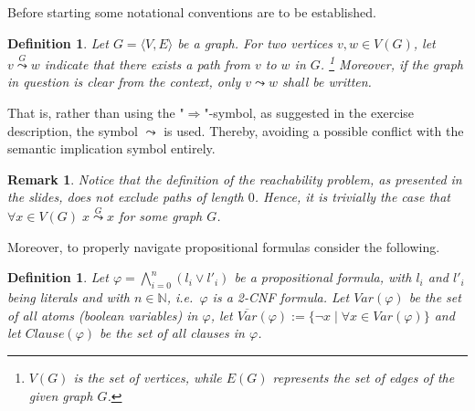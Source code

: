 \documentclass [11pt]{article}
\newcommand{\sto}{\Rightarrow}
\newcommand{\clau}{\mathit{Clause}}
\newcommand{\var}{\mathit{Var}}
\newtheorem{definition}[theorem]{Definition}
\newtheorem{remark}[theorem]{Remark}
\newcommand{\reach}{\leadsto}
\newcommand{\sreach}[1]{\stackrel{#1}{\leadsto}}
\begin{document}
Before starting some notational conventions are to be established.

\begin{definition}
Let $G=\langle V,E \rangle$ be a graph. For two vertices $v,w \in V(G)$, let $v \sreach{G} w$ indicate that there exists a path from $v$ to $w$ in $G$. \footnote{$V(G)$ is the set of vertices, while $E(G)$ represents the set of edges of the given graph $G$.}
Moreover, if the graph in question is clear from the context, only $v \reach w$ shall be written.
\end{definition}



That is, rather than using the "$\sto$"-symbol, as suggested in the exercise description, the symbol  $ \leadsto $ is used. Thereby, avoiding a possible conflict with the semantic implication symbol entirely. 

\begin{remark}
Notice that the definition of the reachability problem, as presented in the slides, does not exclude paths of length $0$. Hence, it is trivially the case that $\forall x \in V(G) \; x \sreach{G} x$ for some graph $G$. 
\end{remark}

Moreover, to properly navigate propositional formulas consider the following.

\begin{definition}
\label{def:2cnf}
Let $\varphi=\bigwedge_{i=0}^n (l_{i} \lor l'_{i})$ be a propositional formula, with $l_i$ and $l'_i$ being literals and with $n\in \mathbb{N}$, i.e.\ $\varphi$ is a 2-CNF formula. Let $\var(\varphi)$ be the set of all atoms (boolean variables) in $\varphi$, let $\overline{\var}(\varphi):=\{\neg x \mid \forall x \in \var(\varphi)\}$ and let $\clau(\varphi)$ be the set of all clauses in $\varphi$.
\end{definition}
\end{document}
